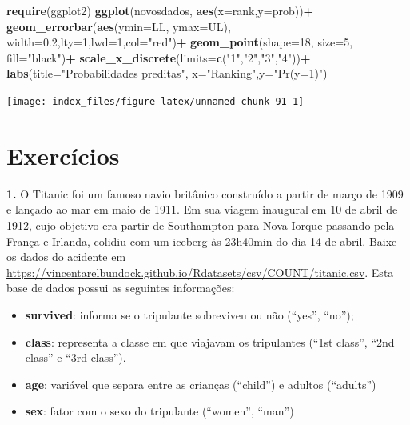 \documentclass[12pt,brazil,oneside]{book}
\newenvironment{Shaded}{\begin{snugshade}}{\end{snugshade}}
\newcommand{\DataTypeTok}[1]{\textcolor[rgb]{0.13,0.29,0.53}{#1}}
\newcommand{\DecValTok}[1]{\textcolor[rgb]{0.00,0.00,0.81}{#1}}
\newcommand{\FloatTok}[1]{\textcolor[rgb]{0.00,0.00,0.81}{#1}}
\newcommand{\KeywordTok}[1]{\textcolor[rgb]{0.13,0.29,0.53}{\textbf{#1}}}
\newcommand{\NormalTok}[1]{#1}
\newcommand{\OperatorTok}[1]{\textcolor[rgb]{0.81,0.36,0.00}{\textbf{#1}}}
\newcommand{\StringTok}[1]{\textcolor[rgb]{0.31,0.60,0.02}{#1}}
\providecommand{\tightlist}{%
  \setlength{\itemsep}{0pt}\setlength{\parskip}{0pt}}
\begin{document}
\begin{Shaded}
\begin{Highlighting}[]
\KeywordTok{require}\NormalTok{(ggplot2)}
\KeywordTok{ggplot}\NormalTok{(novosdados, }\KeywordTok{aes}\NormalTok{(}\DataTypeTok{x=}\NormalTok{rank,}\DataTypeTok{y=}\NormalTok{prob))}\OperatorTok{+}
\StringTok{  }\KeywordTok{geom_errorbar}\NormalTok{(}\KeywordTok{aes}\NormalTok{(}\DataTypeTok{ymin=}\NormalTok{LL, }\DataTypeTok{ymax=}\NormalTok{UL), }\DataTypeTok{width=}\FloatTok{0.2}\NormalTok{,}\DataTypeTok{lty=}\DecValTok{1}\NormalTok{,}\DataTypeTok{lwd=}\DecValTok{1}\NormalTok{,}\DataTypeTok{col=}\StringTok{"red"}\NormalTok{)}\OperatorTok{+}
\StringTok{  }\KeywordTok{geom_point}\NormalTok{(}\DataTypeTok{shape=}\DecValTok{18}\NormalTok{, }\DataTypeTok{size=}\DecValTok{5}\NormalTok{, }\DataTypeTok{fill=}\StringTok{"black"}\NormalTok{)}\OperatorTok{+}
\StringTok{  }\KeywordTok{scale_x_discrete}\NormalTok{(}\DataTypeTok{limits=}\KeywordTok{c}\NormalTok{(}\StringTok{"1"}\NormalTok{,}\StringTok{"2"}\NormalTok{,}\StringTok{"3"}\NormalTok{,}\StringTok{"4"}\NormalTok{))}\OperatorTok{+}
\StringTok{  }\KeywordTok{labs}\NormalTok{(}\DataTypeTok{title=}\StringTok{"Probabilidades preditas"}\NormalTok{, }\DataTypeTok{x=}\StringTok{"Ranking"}\NormalTok{,}\DataTypeTok{y=}\StringTok{"Pr(y=1)"}\NormalTok{)}
\end{Highlighting}
\end{Shaded}

\begin{center}\texttt{[image: index\_files/figure-latex/unnamed-chunk-91-1]} \end{center}

\hypertarget{exercicios}{%
\section{Exercícios}\label{exercicios}}

\textbf{1.} O Titanic foi um famoso navio britânico construído a partir de março de 1909 e lançado ao mar em maio de 1911. Em sua viagem inaugural em 10 de abril de 1912, cujo objetivo era partir de Southampton para Nova Iorque passando pela França e Irlanda, colidiu com um iceberg às 23h40min do dia 14 de abril. Baixe os dados do acidente em
\url{https://vincentarelbundock.github.io/Rdatasets/csv/COUNT/titanic.csv}. Esta base de dados possui as seguintes informações:

\begin{itemize}
\tightlist
\item
  \textbf{survived}: informa se o tripulante sobreviveu ou não (``yes'', ``no'');
\item
  \textbf{class}: representa a classe em que viajavam os tripulantes (``1st class'', ``2nd class'' e ``3rd class'').
\item
  \textbf{age}: variável que separa entre as crianças (``child'') e adultos (``adults'')
\item
  \textbf{sex}: fator com o sexo do tripulante (``women'', ``man'')
\end{itemize}
\end{document}
